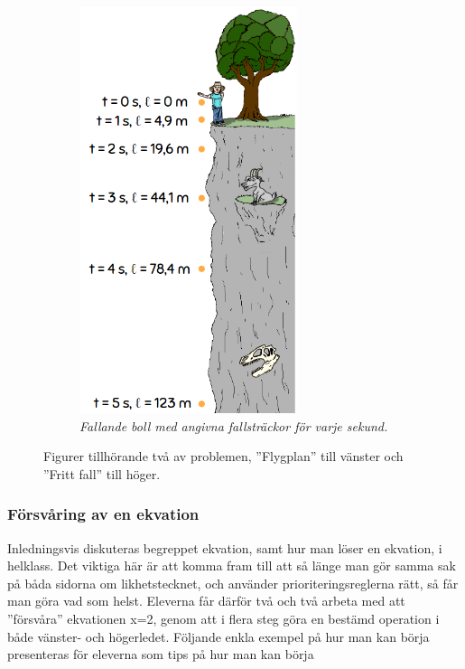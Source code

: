 \begin{figure}
\begin{subfigure}[b]{0.45\textwidth}
        \includegraphics[width=0.7\textwidth]{Figures/FrittFall.PNG}
        \caption{\textsl{Fallande boll med angivna fallsträckor för varje sekund.}}
        \label{fig:FrittFall}
    \end{subfigure}
    \hspace{0.4cm}
    \caption{Figurer tillhörande två av problemen, ''Flygplan'' till vänster och ''Fritt fall'' till höger.}
    \label{fig:three graphs}
\end{figure}
    
    
    
\subsubsection{Försvåring av en ekvation}
    \label{sec:ekvation}

    \textcolor{lila}{Inledningsvis diskuteras begreppet ekvation, samt hur man löser en ekvation, i helklass. Det viktiga här är att komma fram till att så länge man gör samma sak på båda sidorna om likhetstecknet, och använder prioriteringsreglerna rätt, så får man göra vad som helst. Eleverna får därför två och två arbeta med att ''försvåra'' ekvationen x=2, genom att i flera steg göra en bestämd operation i både vänster- och högerledet. Följande enkla exempel på hur man kan börja presenteras för eleverna som tips på hur man kan börja}
    
